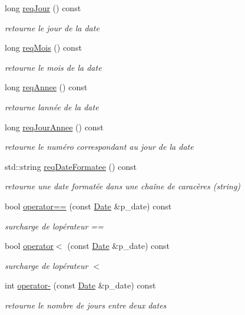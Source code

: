 \begin{DoxyCompactItemize}
long \hyperlink{classutil_1_1Date_aa2b8c7a6e23e9244a5bac8342484d3b8}{req\+Jour} () const
\begin{DoxyCompactList}\small\item\em retourne le jour de la date \end{DoxyCompactList}\item 
long \hyperlink{classutil_1_1Date_a8002c391b812945da68b16cb4a424460}{req\+Mois} () const
\begin{DoxyCompactList}\small\item\em retourne le mois de la date \end{DoxyCompactList}\item 
long \hyperlink{classutil_1_1Date_aa7c4b428456da55a2e3769e93ad9bb8d}{req\+Annee} () const
\begin{DoxyCompactList}\small\item\em retourne l\textquotesingle{}année de la date \end{DoxyCompactList}\item 
long \hyperlink{classutil_1_1Date_a9e76af410b6be9ac4ea9ab4df5797847}{req\+Jour\+Annee} () const
\begin{DoxyCompactList}\small\item\em retourne le numéro correspondant au jour de la date \end{DoxyCompactList}\item 
std\+::string \hyperlink{classutil_1_1Date_ad92d1e9c4d570c5f31a8e06cf2e1ae8c}{req\+Date\+Formatee} () const
\begin{DoxyCompactList}\small\item\em retourne une date formatée dans une chaîne de caracères (string) \end{DoxyCompactList}\item 
bool \hyperlink{classutil_1_1Date_a8114f8e40cee24e1d7a58b910e8f4637}{operator==} (const \hyperlink{classutil_1_1Date}{Date} \&p\+\_\+date) const
\begin{DoxyCompactList}\small\item\em surcharge de l\textquotesingle{}opérateur == \end{DoxyCompactList}\item 
bool \hyperlink{classutil_1_1Date_aefcf8a7520711f783fb0241d460480c5}{operator$<$} (const \hyperlink{classutil_1_1Date}{Date} \&p\+\_\+date) const
\begin{DoxyCompactList}\small\item\em surcharge de l\textquotesingle{}opérateur $<$ \end{DoxyCompactList}\item 
int \hyperlink{classutil_1_1Date_af12f2c545070b5e2b397be5379c5c3fd}{operator-\/} (const \hyperlink{classutil_1_1Date}{Date} \&p\+\_\+date) const
\begin{DoxyCompactList}\small\item\em retourne le nombre de jours entre deux dates \end{DoxyCompactList}\end{DoxyCompactItemize}

